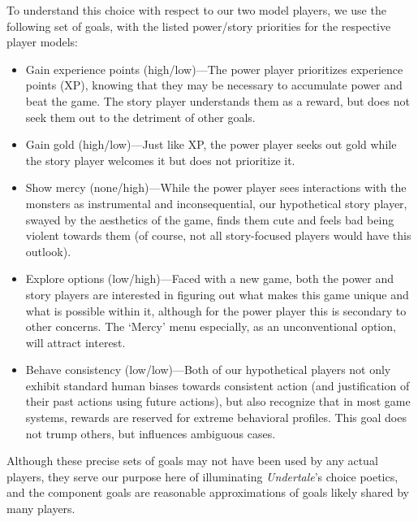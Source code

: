 \documentclass[arts,article,submit,moreauthors,pdftex,10pt,a4paper]{Definitions/mdpi}
\begin{document}
To understand this choice with respect to our two model players, we use the following set of goals, with the listed power/story priorities for the respective player models:

\begin{itemize}
  \item Gain experience points (high/low)---The power player prioritizes experience points (XP), knowing that they may be necessary to accumulate power and beat the game. The story player understands them as a reward, but does not seek them out to the detriment of other goals.
  \item Gain gold (high/low)---Just like XP, the power player seeks out gold while the story player welcomes it but does not prioritize it.
  \item Show mercy (none/high)---While the power player sees interactions with the monsters as instrumental and inconsequential, our hypothetical story player, swayed by the aesthetics of the game, finds them cute and feels bad being violent towards them (of course, not all story-focused players would have this outlook).
  \item Explore options (low/high)---Faced with a new game, both the power and story players are interested in figuring out what makes this game unique and what is possible within it, although for the power player this is secondary to other concerns. The `Mercy' menu especially, as an unconventional option, will attract interest.
  \item Behave consistency (low/low)---Both of our hypothetical players not only exhibit standard human biases towards consistent action (and justification of their past actions using future actions), but also recognize that in most game systems, rewards are reserved for extreme behavioral profiles. This goal does not trump others, but influences ambiguous cases.
\end{itemize}
Although these precise sets of goals may not have been used by any actual players, they serve our purpose here of illuminating \emph{Undertale}'s choice poetics, and the component goals are reasonable approximations of goals likely shared by many players.
\end{document}
